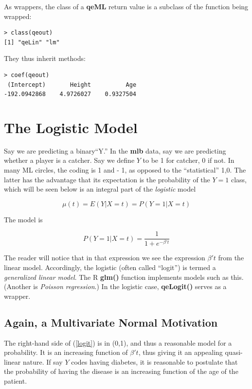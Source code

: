 As wrappers, the class of a \textbf{qeML} return value is a subclass of
the function being wrapped:

\begin{lstlisting}
> class(qeout)
[1] "qeLin" "lm"   
\end{lstlisting}

They thus inherit methods:

\begin{lstlisting}
> coef(qeout)
 (Intercept)       Height          Age 
-192.0942868    4.9726027    0.9327504 
\end{lstlisting}

\section{The Logistic Model}

Say we are predicting a binary``Y.''  In the \textbf{mlb} data, say we
are predicting whether a player is a catcher.  Say we define $Y$ to be 1
for catcher, 0 if not.  In many ML circles, the coding is 1 and - 1, as
opposed to the ``statistical'' 1,0.  The latter has the advantage that
its expectation is the probability of the $Y = 1$ class, which will be
seen below is an integral part of the \textit{logistic} model

\begin{equation}
\mu(t) = E(Y | X= t) = P(Y = 1 | X = t)
\end{equation}

The model is

\begin{equation}
\label{logit}
P(Y = 1 | X = t) =
\frac{1}{1 + e^{-\beta' t}}
\end{equation}

The reader will notice that in that expression we see the expression
$\beta't$ from the linear model.  Accordingly, the logistic (often
called ``logit'') is termed a \textit{generalized linear model}.
The R \textbf{glm()} function implements models such as this.  (Another
is \textit{Poisson regression}.)  In the logistic case,
\textbf{qeLogit()} serves as a wrapper.

\subsection{Again, a Multivariate Normal Motivation}

The right-hand side of (\ref{logit}) is in (0,1), and thus a reasonable
model for a probability.  It is an increasing function of $\beta't$,
thus giving it an appealing quasi-linear nature.  If say $Y$ codes
having diabetes, it is reasonable to postulate that the probability of
having the disease is an increasing function of the age of the patient.

